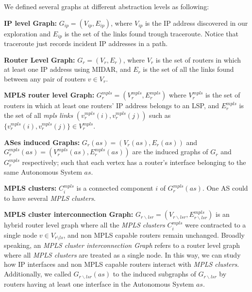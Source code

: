 We defined several graphs at different abstraction levels as following: 


\textbf{IP level Graph:} $G_{ip}=(V_{ip}, E_{ip})$, where $V_{ip}$ is the IP address discovered in our exploration and $E_{ip}$ is the set of the links found trough traceroute.
Notice that traceroute just records incident IP addresses in a path.

\textbf{Router Level Graph:} $G_{r}=(V_{r}, E_{r})$, where $V_{r}$ is the set of routers in which at least one IP address using MIDAR, and $E_{r}$ is the set of all the links found between any pair of routers $v\in V_{r}$.

\textbf{MPLS router level Graph:} $G^{mpls}_{r}=(V^{mpls}_{r}, E^{mpls}_{r})$ where  $V^{mpls}_{r}$ is the set of routers in which at least one routers' IP address belongs to an LSP, and  $E^{mpls}_{r}$ is the set of all \textit{mpls links} $(v^{mpls}_{r}(i), v^{mpls}_{r}(j))$ such as 
$\{{v^{mpls}_{r}(i)},{v^{mpls}_{r}(j)} \}\in V^{mpls}_{r}$.

\textbf{ASes induced Graphs:} $G_{r}(as)=(V_{r}(as), E_{r}(as))$ and $G^{mpls}_{r}(as)=(V^{mpls}_{r}(as), E^{mpls}_{r}(as))$ are the induced graphs of $G_{r}$ and $G^{mpls}_{r}$ respectively; such that each vertex has a router's interface belonging to the same Autonomous System $as$.

\textbf{MPLS clusters:} $C^{mpls}_{i}$ is a connected component $i$ of $G^{mpls}_{r}(as)$. 
One AS could to have several \textit{MPLS clusters}.    

\textbf{MPLS cluster interconnection Graph:} $G_{r\backslash lsr}=(V_{r\backslash lsr},E^{mpls}_{r\backslash lsr})$ is an hybrid router level graph where all the \textit{MPLS clusters}  $C^{mpls}_{i}$ were contracted to a single node $v\in V_{r\setminus ls}$, and non MPLS capable routers remain unchanged. 
Broadly speaking, an \textit{MPLS cluster interconnection Graph} refers to a router level graph where all \textit{MPLS clusters} are treated as a single node. In this way, we can study how IP interfaces and non MPLS capable routers interact with \textit{MPLS clusters}. 
Additionally, we called $G_{r\backslash lsr}(as)$ to the induced subgraphs of $G_{r\backslash lsr}$ by routers having at least one interface in the Autonomous System $as$.


